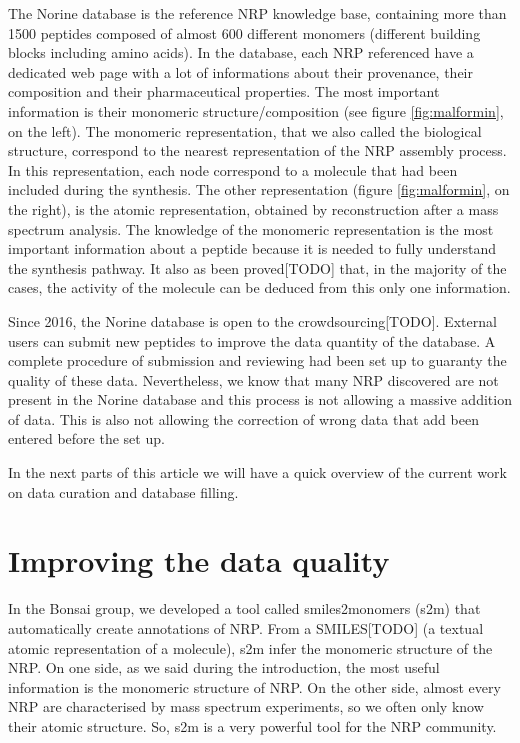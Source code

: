 \documentclass[long, final]{jobim2017}
\begin{document}
The Norine database is the reference NRP knowledge base, containing more than 1500 peptides composed of almost 600 different monomers (different building blocks including amino acids).
In the database, each NRP referenced have a dedicated web page with a lot of informations about their provenance, their composition and their pharmaceutical properties.
The most important information is their monomeric structure/composition (see figure \ref{fig:malformin}, on the left).
The monomeric representation, that we also called the biological structure, correspond to the nearest representation of the NRP assembly process.
In this representation, each node correspond to a molecule that had been included during the synthesis.
The other representation (figure \ref{fig:malformin}, on the right), is the atomic representation, obtained by reconstruction after a mass spectrum analysis.
The knowledge of the monomeric representation is the most important information about a peptide because it is needed to fully understand the synthesis pathway.
It also as been proved[TODO] that, in the majority of the cases, the activity of the molecule can be deduced from this only one information.

Since 2016, the Norine database is open to the crowdsourcing[TODO].
External users can submit new peptides to improve the data quantity of the database.
A complete procedure of submission and reviewing had been set up to guaranty the quality of these data.
Nevertheless, we know that many NRP discovered are not present in the Norine database and this process is not allowing a massive addition of data.
This is also not allowing the correction of wrong data that add been entered before the set up.

In the next parts of this article we will have a quick overview of the current work on data curation and database filling.


\section{Improving the data quality}

In the Bonsai group, we developed a tool called smiles2monomers (s2m) that automatically create annotations of NRP.
From a SMILES[TODO] (a textual atomic representation of a molecule), s2m infer the monomeric structure of the NRP.
On one side, as we said during the introduction, the most useful information is the monomeric structure of NRP.
On the other side, almost every NRP are characterised by mass spectrum experiments, so we often only know their atomic structure.
So, s2m is a very powerful tool for the NRP community.
\end{document}
